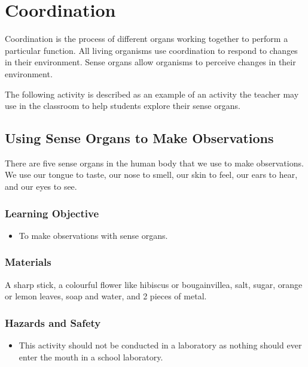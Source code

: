 \section{Coordination}
Coordination is the process of different organs working together to perform a particular function. All living organisms use coordination to respond to changes in their environment. Sense organs allow organisms to perceive changes in their environment.

The following activity is described as an example of an activity the teacher may use in the classroom to help students explore their sense organs.

\subsection{Using Sense Organs to Make Observations}
There are five sense organs in the human body that we use to make observations. We use our tongue to taste, our nose to smell, our skin to feel, our ears to hear, and our eyes to see.

\subsubsection*{Learning Objective}
\begin{itemize}
\item{To make observations with sense organs.}
\end{itemize}

\subsubsection*{Materials}
A sharp stick, a colourful flower like hibiscus or bougainvillea, salt, sugar, orange or lemon leaves, soap and water, and 2 pieces of metal.

\subsubsection*{Hazards and Safety}
\begin{itemize}
\item{This activity should not be conducted in a laboratory as nothing should ever enter the mouth in a school laboratory.}
\end{itemize}

